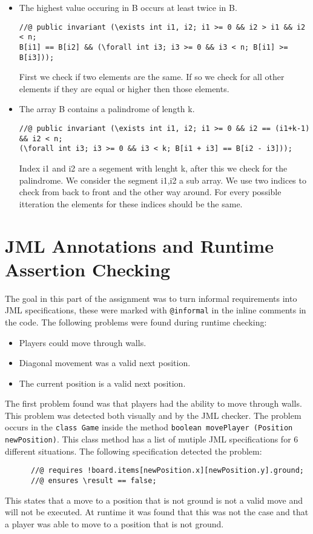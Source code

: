 \documentclass[a4paper]{article}
\begin{document}
\begin{itemize}
	\item The highest value occuring in B occurs at least twice in B.
	\begin{lstlisting}
//@ public invariant (\exists int i1, i2; i1 >= 0 && i2 > i1 && i2 < n;
B[i1] == B[i2] && (\forall int i3; i3 >= 0 && i3 < n; B[i1] >= B[i3]));	
	\end{lstlisting}
	First we check if two elements are the same. If so we check for all other elements if they are equal or higher then those elements.
	
	\item The array B contains a palindrome of length k.
	\begin{lstlisting}
//@ public invariant (\exists int i1, i2; i1 >= 0 && i2 == (i1+k-1) && i2 < n;
(\forall int i3; i3 >= 0 && i3 < k; B[i1 + i3] == B[i2 - i3]));	
	\end{lstlisting}
	Index i1 and i2 are a segement with lenght k, after this we check for the palindrome. We consider the segment i1,i2 a sub array. We use two indices to check from back to front and the other way around. For every possible itteration the elements for these indices should be the same.
\end{itemize}

\section{JML Annotations and Runtime Assertion Checking}
The goal in this part of the assignment was to turn informal requirements into JML specifications, these were marked with \texttt{@informal} in the inline comments in the code. \newline
The following problems were found during runtime checking:
\begin{itemize}
	\item Players could move through walls.
	\item Diagonal movement was a valid next position.
	\item The current position is a valid next position.
\end{itemize}
The first problem found was that players had the ability to move through walls. This problem was detected both visually and by the JML checker. The problem occurs in the \texttt{class Game} inside the method \texttt{boolean movePlayer (Position newPosition)}. This class method has a list of mutiple JML specifications for 6 different situations. The following specification detected the problem:
\begin{lstlisting}
	  //@ requires !board.items[newPosition.x][newPosition.y].ground;
	  //@ ensures \result == false;
\end{lstlisting}
This states that a move to a position that is not ground is not a valid move and will not be executed. At runtime it was found that this was not the case and that a player was able to move to a position that is not ground.
\end{document}
